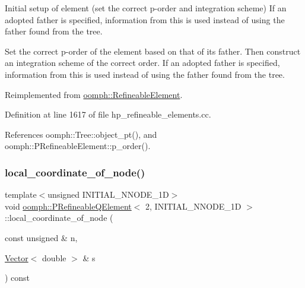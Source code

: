 Initial setup of element (set the correct p-\/order and integration scheme) If an adopted father is specified, information from this is used instead of using the father found from the tree. 

Set the correct p-\/order of the element based on that of its father. Then construct an integration scheme of the correct order. If an adopted father is specified, information from this is used instead of using the father found from the tree. 

Reimplemented from \hyperlink{classoomph_1_1RefineableElement_a61ae74d94be7abc7231f34f3322f8e13}{oomph\+::\+Refineable\+Element}.



Definition at line 1617 of file hp\+\_\+refineable\+\_\+elements.\+cc.



References oomph\+::\+Tree\+::object\+\_\+pt(), and oomph\+::\+P\+Refineable\+Element\+::p\+\_\+order().

\mbox{\label{classoomph_1_1PRefineableQElement_3_012_00_01INITIAL__NNODE__1D_01_4_a30e312b39ead5fbea0839bd5b9a8dea3}} 
\subsubsection{\texorpdfstring{local\+\_\+coordinate\+\_\+of\+\_\+node()}{local\_coordinate\_of\_node()}}
{\footnotesize\ttfamily template$<$unsigned I\+N\+I\+T\+I\+A\+L\+\_\+\+N\+N\+O\+D\+E\+\_\+1D$>$ \\
void \hyperlink{classoomph_1_1PRefineableQElement}{oomph\+::\+P\+Refineable\+Q\+Element}$<$ 2, I\+N\+I\+T\+I\+A\+L\+\_\+\+N\+N\+O\+D\+E\+\_\+1D $>$\+::local\+\_\+coordinate\+\_\+of\+\_\+node (\begin{DoxyParamCaption}\item[{const unsigned \&}]{n,  }\item[{\hyperlink{classoomph_1_1Vector}{Vector}$<$ double $>$ \&}]{s }\end{DoxyParamCaption}) const\hspace{0.3cm}{\ttfamily [virtual]}}



